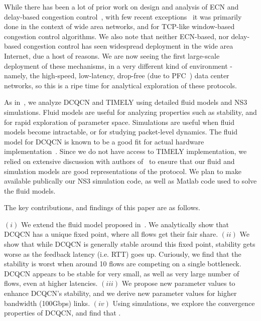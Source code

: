 
While there has been a lot of prior work on design and analysis of ECN and
delay-based congestion control~\cite{ecn, tcp-vegas, Hollot:PIController}, with few
recent exceptions~\cite{dctcp-analysis, qcn-analysis} it was primarily done in
the context of wide area networks, and for TCP-like window-based congestion
control algorithms.  We also note that neither ECN-based, nor delay-based
congestion control has seen widespread deployment in the wide area Internet, due
a host of reasons. We are now seeing the first large-scale deployment of these
mechanisms, in a very different kind of environment - namely, the high-speed,
low-latency, drop-free (due to PFC~\cite{pfc}) data center networks, so this is
a ripe time for analytical exploration of these protocols.


As in~\cite{dctcp-analysis, qcn-analysis}, we analyze DCQCN and TIMELY using
detailed fluid models and NS3 simulations. Fluid models are useful for analyzing
properties such as stability, and for rapid exploration of parameter space.
Simulations are useful when fluid models become intractable, or for studying
packet-level dynamics. The fluid model for DCQCN is known to be a good fit for
actual hardware implementation~\cite{dcqcn}. Since we do not have access to
TIMELY implementation, we relied on extensive discussion with authors
of~\cite{timely} to ensure that our fluid and simulation models are good
representations of the protocol. We plan to make available publically our NS3
simulation code, as well as Matlab code used to solve the fluid models.


The key contributions, and findings of this paper are as follows.

 $(i)$ We extend the fluid model proposed in~\cite{dcqcn}. We
analytically show that DCQCN has a unique fixed point, where all flows get their
fair share. $(ii)$ We show that while DCQCN is generally stable around this
fixed point, stability gets worse as the feedback latency (i.e. RTT) goes up.
Curiously, we find that the stability is worst when around 10 flows are
competing on a single bottleneck. DCQCN appears to be stable for very small, as
well as very large number of flows, even at higher latencies. $(iii)$ We propose
new parameter values to enhance DCQCN's stability, and we derive new parameter values
for higher bandwidth (100Gbps) links. $(iv)$ Using simulations, we explore the
convergence properties of DCQCN, and find that .

